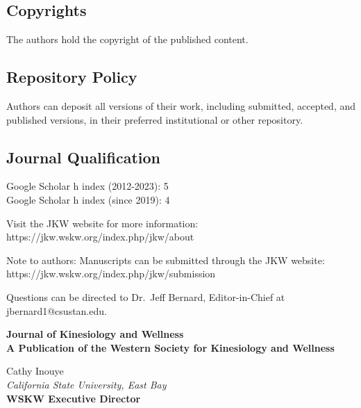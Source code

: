 \documentclass[
  letterpaper,
  DIV=11,
  numbers=noendperiod]{scrartcl}
\begin{document}
\subsection{Copyrights}\label{copyrights}

The authors hold the copyright of the published content.

\subsection{Repository Policy}\label{repository-policy}

Authors can deposit all versions of their work, including submitted,
accepted, and published versions, in their preferred institutional or
other repository.

\subsection{Journal Qualification}\label{journal-qualification}

Google Scholar h index (2012-2023): 5\\
Google Scholar h index (since 2019): 4

Visit the JKW website for more information:\\
https://jkw.wskw.org/index.php/jkw/about

Note to authors: Manuscripts can be submitted through the JKW website:\\
https://jkw.wskw.org/index.php/jkw/submission

Questions can be directed to Dr.~Jeff Bernard, Editor-in-Chief at
jbernard1@csustan.edu.

\newpage

\begin{center}
    \textbf{\Large \textcolor{blue!60!black}{Journal of Kinesiology and Wellness}} \\
    \vspace{0.2cm}
    \textbf{A Publication of the Western Society for Kinesiology and Wellness}
\end{center}

\vspace{0.5cm}

\begin{center}
    Cathy Inouye \\
    \textit{California State University, East Bay} \\
    \textbf{WSKW Executive Director}
\end{center}
\end{document}
